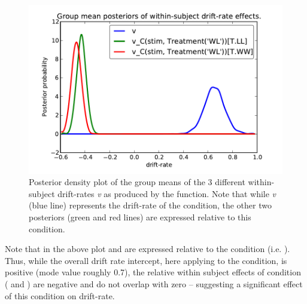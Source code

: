 \documentclass[letterpaper,10pt,english]{article}
\begin{document}
\begin{figure}[H]
\includegraphics[scale=.7]{hddm_demo_fig_07.pdf}
\caption{Posterior density plot of the group means of the 3 different within-subject drift-rates \emph{v} as produced by the  function. Note that while \emph{v} (blue line) represents the drift-rate of the  condition, the other two posteriors (green and red lines) are expressed relative to this condition.}
\label{fig.post_within}
\end{figure}
Note that in the above plot  and  are expressed relative to the  condition (i.e. ). Thus, while the overall drift rate intercept, here applying to the  condition, is positive (mode value roughly 0.7), the relative within subject effects of condition ( and ) are negative and do not overlap with zero -- suggesting a significant effect of this condition on drift-rate.
\end{document}
